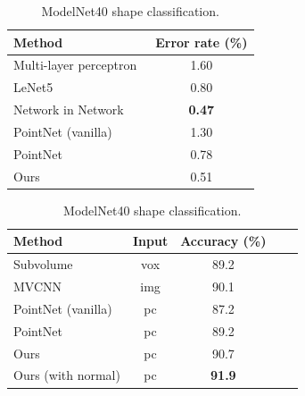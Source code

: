 \begin{table}[t!]
    \begin{minipage}{.45\textwidth}
        \centering
        \small
        \begin{tabular}{lc}
        \toprule
        Method     & Error rate (\%) \\
        \midrule
        Multi-layer perceptron~\cite{simard2003best} & 1.60     \\
        LeNet5~\cite{lecun1998gradient}     & 0.80      \\
        Network in Network~\cite{lin2013network}      & \textbf{0.47} \\
        PointNet (vanilla)~\cite{qi2016pointnet}    & 1.30  \\
        PointNet~\cite{qi2016pointnet}    & 0.78  \\ \midrule
        Ours    & 0.51 \\
        \bottomrule
        \end{tabular}
        \caption{MNIST digit classification.}
        \label{tab:mnist}
    \end{minipage}
    \begin{minipage}{.55\textwidth}
        \centering
        \small
        \begin{tabular}[width=\linewidth]{lcccc}
        \toprule
        Method  & Input & Accuracy (\%) \\
        \midrule
        Subvolume~\cite{qi2016volumetric} &vox & 89.2 \\
        MVCNN~\cite{su15mvcnn} &img & 90.1 \\
        PointNet (vanilla)~\cite{qi2016pointnet} &pc & 87.2 \\
        PointNet~\cite{qi2016pointnet} &pc & 89.2 \\ \midrule
        Ours  &pc & 90.7 \\ 
        Ours (with normal)   &pc&  \textbf{91.9} \\
        \bottomrule
        \end{tabular}
        \caption{ModelNet40 shape classification.}
        \label{tab:modelnet}
    \end{minipage}
  \end{table}

